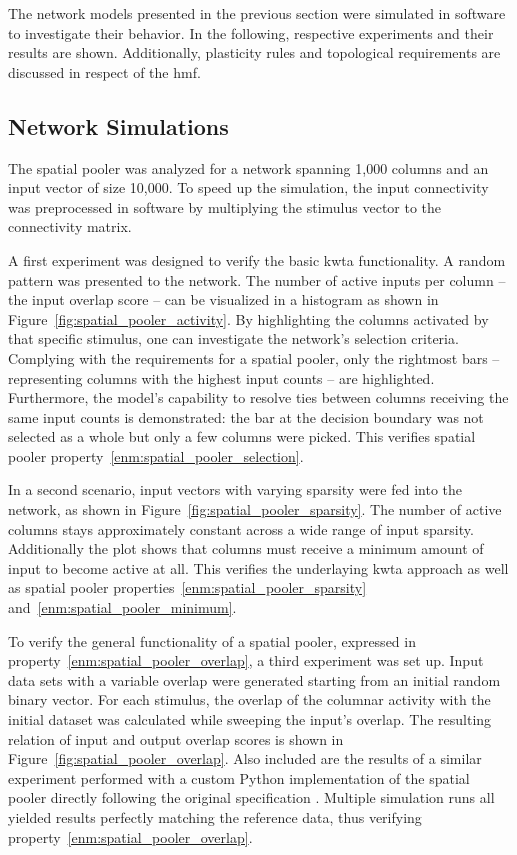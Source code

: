 The network models presented in the previous section were simulated in software to investigate their behavior. In the following, respective experiments and their results are shown. Additionally, plasticity rules and topological requirements are discussed in respect of the \gls{hmf}.

\subsection{Network Simulations}


The spatial pooler was analyzed for a network spanning 1,000 columns and an
input vector of size 10,000. To speed up the simulation, the input connectivity
was preprocessed in software by multiplying the stimulus vector to the
connectivity matrix.

A first experiment was designed to verify the basic \gls{kwta} functionality. A
random pattern was presented to the network. The number of active inputs per
column -- the input overlap score -- can be visualized in a histogram as shown
in Figure~\ref{fig:spatial_pooler_activity}. By highlighting the columns
activated by that specific stimulus, one can investigate the network's selection
criteria. Complying with the requirements for a spatial pooler, only the
rightmost bars -- representing columns with the highest input counts -- are
highlighted. Furthermore, the model's capability to resolve ties between columns
receiving the same input counts is demonstrated: the bar at the decision
boundary was not selected as a whole but only a few columns were picked. This
verifies spatial pooler property~\ref{enm:spatial_pooler_selection}.

In a second scenario, input vectors with varying sparsity were fed into the
network, as shown in Figure~\ref{fig:spatial_pooler_sparsity}. The number of
active columns stays approximately constant across a wide range of input
sparsity. Additionally the plot shows that columns must receive a minimum amount
of input to become active at all. This verifies the underlaying \gls{kwta}
approach as well as spatial pooler properties~\ref{enm:spatial_pooler_sparsity}
and~\ref{enm:spatial_pooler_minimum}.

To verify the general functionality of a spatial pooler,  expressed in
property~\ref{enm:spatial_pooler_overlap}, a third experiment was set up. Input
data sets with a variable overlap were generated starting from an initial random
binary vector. For each stimulus, the overlap of the columnar activity with the
initial dataset was calculated while sweeping the input's overlap. The resulting
relation of input and output overlap scores is shown in
Figure~\ref{fig:spatial_pooler_overlap}. Also included are the results of a
similar experiment performed with a custom Python implementation of the spatial
pooler directly following the original specification \citep{numenta2011htm}.
Multiple simulation runs all yielded results perfectly matching the reference
data, thus verifying property~\ref{enm:spatial_pooler_overlap}.

